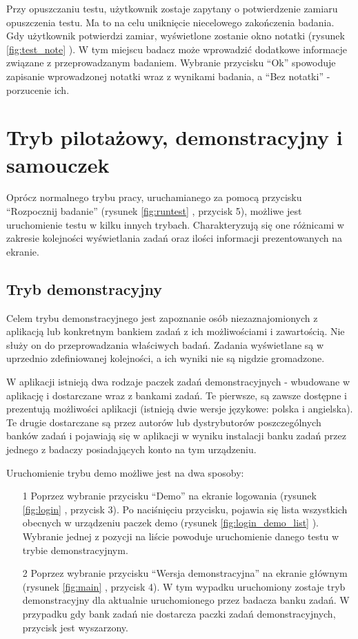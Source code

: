 \documentclass[a4paper,10pt,twosided]{book}
\newcommand{\refwithpage}[3]{
\ref{#1}\ifthenelse{\equal{\thepage}{\pageref{#1}}}{}{#2\pageref{#1}#3}%
}
\newcommand{\ppref}[1]{\refwithpage{#1}{ -- strona }{}}
\begin{document}
Przy opuszczaniu testu, użytkownik zostaje zapytany o potwierdzenie zamiaru opuszczenia testu. Ma to na celu uniknięcie niecelowego zakończenia badania. Gdy użytkownik potwierdzi zamiar, wyświetlone zostanie okno notatki (rysunek \ppref{fig:test_note}). W tym miejscu badacz może wprowadzić dodatkowe informacje związane z przeprowadzanym badaniem. Wybranie przycisku ``Ok'' spowoduje zapisanie wprowadzonej notatki wraz z wynikami badania, a ``Bez notatki'' - porzucenie ich.


\section{Tryb pilotażowy, demonstracyjny i samouczek}
\label{sec:test_pilotdemotutorial}

Oprócz normalnego trybu pracy, uruchamianego za pomocą przycisku ``Rozpocznij badanie'' (rysunek \ppref{fig:runtest}, przycisk 5), możliwe jest uruchomienie testu w kilku innych trybach. Charakteryzują się one różnicami w zakresie kolejności wyświetlania zadań oraz ilości informacji prezentowanych na ekranie.

\subsection{Tryb demonstracyjny}
\label{sec:test_pilotdemotutorial_demo}

Celem trybu demonstracyjnego jest zapoznanie osób niezaznajomionych z aplikacją lub konkretnym bankiem zadań z ich możliwościami i zawartością. Nie służy on do przeprowadzania właściwych badań. Zadania wyświetlane są w uprzednio zdefiniowanej kolejności, a ich wyniki nie są nigdzie gromadzone.

W aplikacji istnieją dwa rodzaje paczek zadań demonstracyjnych - wbudowane w aplikację i dostarczane wraz z bankami zadań. Te pierwsze, są zawsze dostępne i prezentują możliwości aplikacji (istnieją dwie wersje językowe: polska i angielska). Te drugie dostarczane są przez autorów lub dystrybutorów poszczególnych banków zadań i pojawiają się w aplikacji w wyniku instalacji banku zadań przez jednego z badaczy posiadających konto na tym urządzeniu.

Uruchomienie trybu demo możliwe jest na dwa sposoby:
\begin{enumerate}
\item[1] Poprzez wybranie przycisku ``Demo'' na ekranie logowania (rysunek \ppref{fig:login}, przycisk 3). Po naciśnięciu przycisku, pojawia się lista wszystkich obecnych w urządzeniu paczek demo (rysunek \ppref{fig:login_demo_list}). Wybranie jednej z pozycji na liście powoduje uruchomienie danego testu w trybie demonstracyjnym.
\item[2] Poprzez wybranie przycisku ``Wersja demonstracyjna'' na ekranie głównym (rysunek \ppref{fig:main}, przycisk 4). W tym wypadku uruchomiony zostaje tryb demonstracyjny dla aktualnie uruchomionego przez badacza banku zadań. W przypadku gdy bank zadań nie dostarcza paczki zadań demonstracyjnych, przycisk jest wyszarzony.
\end{enumerate}
\end{document}
